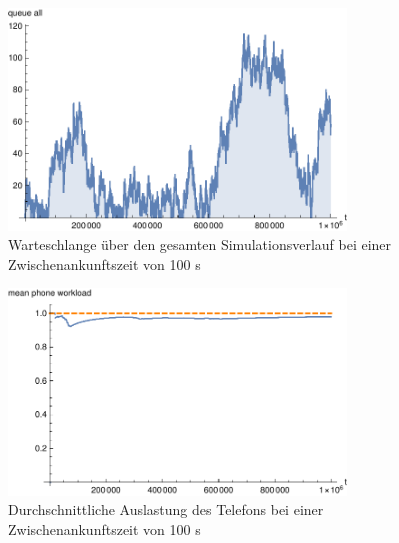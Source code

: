 \begin{figure}[htpb]
	\centering
	\includegraphics[width=0.8\textwidth]{abbildungen/1_Phone_VIP/Arrival_100_Serve_100_dur_1000000_Skip_0/QueueStepPlotAllFiltered.pdf}
	\caption{Warteschlange über den gesamten Simulationsverlauf bei einer Zwischenankunftszeit von 100 s}
	\label{fig:1_Phone_VIP_100_QueuePlot_All}
\end{figure}



\begin{figure}[htpb]
	\centering
	\includegraphics[width=0.8\textwidth]{abbildungen/1_Phone_VIP/Arrival_100_Serve_100_dur_1000000_Skip_0/MeanPhoneWorkload.pdf}
	\caption{Durchschnittliche Auslastung des Telefons bei einer Zwischenankunftszeit von 100 s}
	\label{fig:1_Phone_VIP_100_WorkLoad}
\end{figure}



